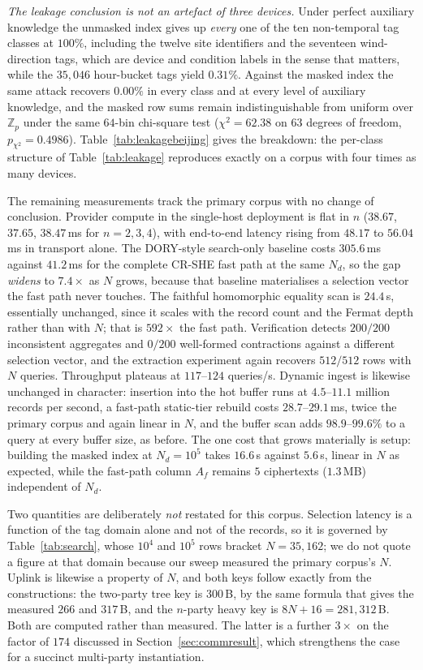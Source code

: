 \documentclass[a4paper,fleqn]{cas-sc}
\begin{document}
\emph{The leakage conclusion is not an artefact of three devices.} Under
perfect auxiliary knowledge the unmasked index gives up \emph{every} one of
the ten non-temporal tag classes at $100\%$, including the twelve site
identifiers and the seventeen wind-direction tags, which are device and
condition labels in the sense that matters, while the $35{,}046$ hour-bucket
tags yield $0.31\%$. Against the masked index the same attack recovers
$0.00\%$ in every class and at every level of auxiliary knowledge, and the
masked row sums remain indistinguishable from uniform over $\mathbb{Z}_p$
under the same $64$-bin chi-square test ($\chi^2=62.38$ on $63$ degrees of
freedom, $p_{\chi^2}=0.4986$). Table~\ref{tab:leakagebeijing} gives the
breakdown: the per-class structure of Table~\ref{tab:leakage} reproduces
exactly on a corpus with four times as many devices.

The remaining measurements track the primary corpus with no change of
conclusion. Provider compute in the single-host deployment is flat in $n$
($38.67$, $37.65$, $38.47$\,ms for $n=2,3,4$), with end-to-end latency rising
from $48.17$ to $56.04$\,ms in transport alone. The DORY-style search-only
baseline costs $305.6$\,ms against $41.2$\,ms for the complete CR-SHE fast
path at the same $N_d$, so the gap \emph{widens} to $7.4\times$ as $N$ grows,
because that baseline materialises a selection vector the fast path never
touches. The faithful homomorphic equality scan is $24.4$\,s, essentially
unchanged, since it scales with the record count and the Fermat depth rather
than with $N$; that is $592\times$ the fast path. Verification detects
$200/200$ inconsistent aggregates and $0/200$ well-formed contractions against
a different selection vector, and the extraction experiment again recovers
$512/512$ rows with $N$ queries. Throughput plateaus at $117$--$124$
queries/s. Dynamic ingest is likewise unchanged in character: insertion into
the hot buffer runs at $4.5$--$11.1$ million records per second, a fast-path
static-tier rebuild costs $28.7$--$29.1$\,ms, twice the primary corpus and
again linear in $N$, and the buffer scan adds $98.9$--$99.6\%$ to a query at
every buffer size, as before. The one cost that grows materially is setup:
building the masked index at $N_d=10^5$ takes $16.6$\,s against $5.6$\,s,
linear in $N$ as expected, while the fast-path column $A_f$ remains $5$
ciphertexts ($1.3$\,MB) independent of $N_d$.

Two quantities are deliberately \emph{not} restated for this corpus. Selection
latency is a function of the tag domain alone and not of the records, so it is
governed by Table~\ref{tab:search}, whose $10^4$ and $10^5$ rows bracket
$N=35{,}162$; we do not quote a figure at that domain because our sweep
measured the primary corpus's $N$. Uplink is likewise a property of $N$, and
both keys follow exactly from the constructions: the two-party tree key is
$300$\,B, by the same formula that gives the measured $266$ and $317$\,B, and
the $n$-party heavy key is $8N+16=281{,}312$\,B. Both are computed rather than
measured. The latter is a further $3\times$ on the factor of $174$ discussed
in Section~\ref{sec:commresult}, which strengthens the case for a succinct
multi-party instantiation.
\end{document}
